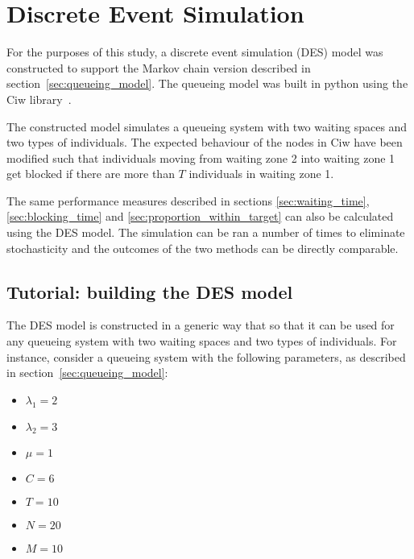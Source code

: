 \section{Discrete Event Simulation}\label{sec:appendix_des}

For the purposes of this study, a discrete event simulation (DES) model was
constructed to support the Markov chain version described in 
section~\ref{sec:queueing_model}.
The queueing model was built in python using the Ciw 
library~\cite{ciwpython}.

The constructed model simulates a queueing system with two waiting spaces and 
two types of individuals. 
The expected behaviour of the nodes in Ciw have been modified such that 
individuals moving from waiting zone 2 into waiting zone 1 get blocked 
if there are more than \(T\) individuals in waiting zone 1.

The same performance measures described in sections 
\ref{sec:waiting_time}, \ref{sec:blocking_time} and 
\ref{sec:proportion_within_target} can also be calculated using the DES model.
The simulation can be ran a number of times to eliminate stochasticity and the
outcomes of the two methods can be directly comparable. 

\subsection{Tutorial: building the DES model}

The DES model is constructed in a generic way that so that it can be used for
any queueing system with two waiting spaces and two types of individuals.
For instance, consider a queueing system with the following parameters, as 
described in section~\ref{sec:queueing_model}:

\begin{multicols}{4}
    \begin{itemize}
        \item \( \lambda_1 = 2 \)
        \item \( \lambda_2 = 3 \)
        \columnbreak
        \item \( \mu = 1 \)
        \item \( C = 6 \)
        \columnbreak
        \item \( T = 10 \)
        \item \( N = 20 \)
        \columnbreak
        \item \( M = 10 \)
    \end{itemize}
\end{multicols}


